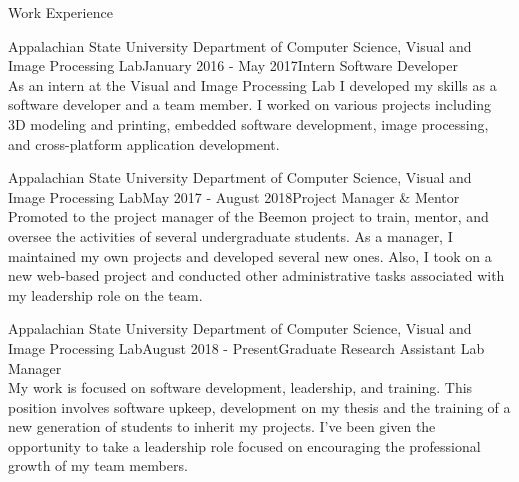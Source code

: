 \documentclass{resume} %
\begin{document}
\begin{rSection}{Work Experience}

\begin{rSubsection}{Appalachian State University Department of Computer Science, Visual and Image Processing Lab}{January 2016 - May 2017}{Intern Software Developer}{}
\\ As an intern at the Visual and Image Processing Lab I developed my skills as a software developer and a team member.  I worked on various projects including 3D modeling and printing, embedded software development, image processing, and cross-platform application development.  
\end{rSubsection}

\begin{rSubsection}{Appalachian State University Department of Computer Science, Visual and Image Processing Lab}{May 2017 - August 2018}{Project Manager & Mentor}{}
\\ Promoted to the project manager of the Beemon project to train, mentor, and oversee the activities of several undergraduate students.  As a manager, I maintained my own projects and developed several new ones. Also, I took on a new web-based project and conducted other administrative tasks associated with my leadership role on the team.  
\end{rSubsection}

\begin{rSubsection}{Appalachian State University Department of Computer Science, Visual and Image Processing Lab}{August 2018 - Present}{Graduate Research Assistant Lab Manager}{}
\\ My work is focused on software development, leadership, and training.  This position involves software upkeep, development on my thesis and the training of a new generation of students to inherit my projects. I’ve been given the opportunity to take a leadership role focused on encouraging the professional growth of my team members.
\end{rSubsection}

\end{rSection}

\end{document}
